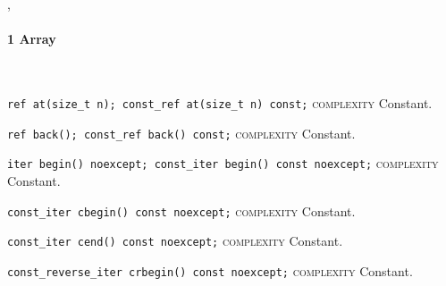 \setlength{\fboxsep}{.5\fboxsep}
\sep
{}
\paragraph{1 Array}\mbox{}\vspace{0.5em}\\
\noindent{}\hspace*{0.25em}\lstinline[basicstyle=\ttfamily\color{cgreen}]{ref at(size_t n); const_ref at(size_t n) const;} \textsc{complexity} Constant.\\\vspace{-0.6em}

\noindent{}\hspace*{0.25em}\lstinline[basicstyle=\ttfamily\color{cgreen}]{ref back(); const_ref back() const;} \textsc{complexity} Constant.\\\vspace{-0.6em}

\noindent{}\hspace*{0.25em}\lstinline[basicstyle=\ttfamily\color{cgreen}]{iter begin() noexcept; const_iter begin() const noexcept;} \textsc{complexity} Constant.\\\vspace{-0.6em}

\noindent{}\hspace*{0.25em}\lstinline[basicstyle=\ttfamily\color{cgreen}]{const_iter cbegin() const noexcept;} \textsc{complexity} Constant.\\\vspace{-0.6em}

\noindent{}\hspace*{0.25em}\lstinline[basicstyle=\ttfamily\color{cgreen}]{const_iter cend() const noexcept;} \textsc{complexity} Constant.\\\vspace{-0.6em}

\noindent{}\hspace*{0.25em}\lstinline[basicstyle=\ttfamily\color{cgreen}]{const_reverse_iter crbegin() const noexcept;} \textsc{complexity} Constant.\\\vspace{-0.6em}

